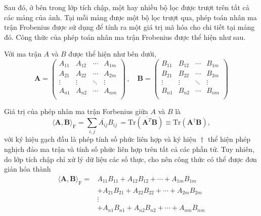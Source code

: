 Sau đó, ở bên trong lớp tích chập, một hay nhiều bộ lọc được trượt trên tất cả các mảng của ảnh. Tại mỗi mảng được một bộ lọc trượt qua, phép toán nhân ma trận Frobenius được sử dụng để tính ra một giá trị mã hóa cho chi tiết tại mảng đó. Công thức của phép toán nhân ma trận Frobenius được thể hiện như sau.

Với ma trận $A$ và $B$ được thể hiện như bên dưới,
\begin{equation}
    {\displaystyle \mathbf {A} ={\begin{pmatrix}A_{11}&A_{12}&\cdots &A_{1m}\\A_{21}&A_{22}&\cdots &A_{2m}\\\vdots &\vdots &\ddots &\vdots \\A_{n1}&A_{n2}&\cdots &A_{nm}\\\end{pmatrix}}\,,\quad \mathbf {B} ={\begin{pmatrix}B_{11}&B_{12}&\cdots &B_{1m}\\B_{21}&B_{22}&\cdots &B_{2m}\\\vdots &\vdots &\ddots &\vdots \\B_{n1}&B_{n2}&\cdots &B_{nm}\\\end{pmatrix}}}
\end{equation}

Giá trị của phép nhân ma trận Forbenius giữa $A$ và $B$ là
\begin{equation}
    {\displaystyle \langle \mathbf {A} ,\mathbf {B} \rangle _{\mathrm {F} }=\sum _{i,j}{\overline {A_{ij}}}B_{ij}\,=\mathrm {Tr} \left({\overline {\mathbf {A} ^{T}}}\mathbf {B} \right)\equiv \mathrm {Tr} \left(\mathbf {A} ^{\!\dagger }\mathbf {B} \right)},
\end{equation}
với ký hiệu gạch đầu là phép tính số phức liên hợp và ký hiệu $\!\dagger$ thể hiện phép nghịch đảo ma trận và tính số phức liên hợp trên tất cả các phần tử. Tuy nhiên, do lớp tích chập chỉ xử lý dữ liệu các số thực, cho nên công thức có thể được đơn giản hóa thành
\begin{equation}
    {\displaystyle {\begin{aligned}\langle \mathbf {A} ,\mathbf {B} \rangle _{\mathrm {F} }=&{ {A}}_{11}B_{11}+{ {A}}_{12}B_{12}+\cdots +{ {A}}_{1m}B_{1m}\\&+{ {A}}_{21}B_{21}+{ {A}}_{22}B_{22}+\cdots +{ {A}}_{2m}B_{2m}\\&\vdots \\&+{ {A}}_{n1}B_{n1}+{ {A}}_{n2}B_{n2}+\cdots +{ {A}}_{nm}B_{nm}\\\end{aligned}}}
\end{equation}

